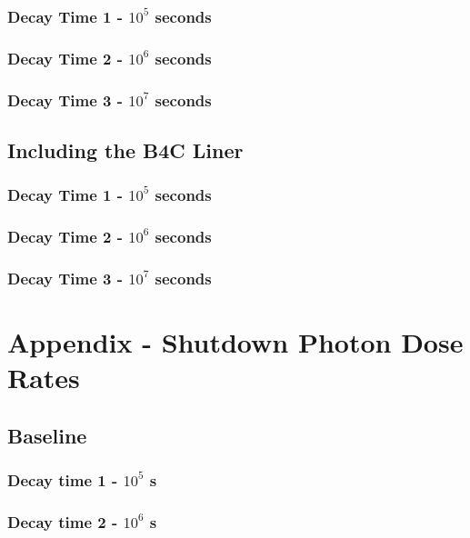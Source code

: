 \documentclass[12pt]{article}
\begin{document}
\subsubsection{Decay Time 1 - $10^{5}$ seconds}

\subsubsection{Decay Time 2 - $10^{6}$ seconds}

\subsubsection{Decay Time 3 - $10^{7}$ seconds}

\subsection{Including the B4C Liner}
\label{appendix:grp_photon_src_b4c}
\subsubsection{Decay Time 1 - $10^{5}$ seconds}

\subsubsection{Decay Time 2 - $10^{6}$ seconds}

\subsubsection{Decay Time 3 - $10^{7}$ seconds}

\section{Appendix - Shutdown Photon Dose Rates}
\subsection{Baseline}
\subsubsection{Decay time 1 - $10^5$ s}

\clearpage
\subsubsection{Decay time 2 - $10^6$ s}

\clearpage
\end{document}
